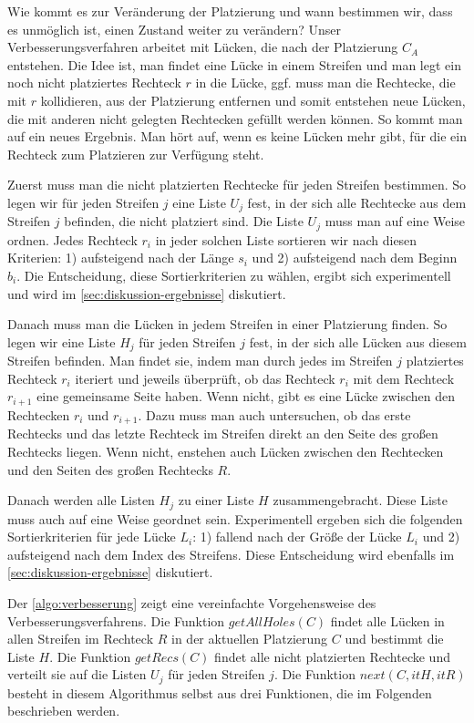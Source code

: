 Wie kommt es zur Veränderung der Platzierung und wann bestimmen wir,
dass es unmöglich ist, einen Zustand weiter zu verändern?
Unser Verbesserungsverfahren arbeitet mit Lücken, die 
nach der Platzierung $C_A$ entstehen.
Die Idee ist, man findet eine Lücke in einem Streifen 
und man legt ein noch nicht platziertes Rechteck $r$ in die Lücke,
ggf. muss man die Rechtecke,
die mit $r$ kollidieren, aus der Platzierung entfernen
und somit entstehen neue Lücken,
die mit anderen nicht gelegten Rechtecken gefüllt werden können.
So kommt man auf ein neues Ergebnis.
Man hört auf, wenn es keine Lücken mehr gibt, für die ein Rechteck zum Platzieren zur Verfügung steht.


Zuerst muss man die nicht platzierten Rechtecke für jeden Streifen bestimmen. 
So legen wir für jeden Streifen $j$ eine Liste $U_j$ fest, in der sich alle 
Rechtecke aus dem Streifen $j$ befinden, die nicht platziert sind.
Die Liste $U_j$ muss man auf eine Weise ordnen.
Jedes Rechteck $r_i$ in jeder solchen Liste sortieren wir nach diesen Kriterien:
1) aufsteigend nach der Länge $s_i$ und 2) aufsteigend nach dem Beginn $b_i$.
Die Entscheidung, diese Sortierkriterien zu wählen, ergibt sich experimentell 
und wird im \cref{sec:diskussion-ergebnisse} diskutiert.


Danach muss man die Lücken in jedem Streifen in einer Platzierung finden.
So legen wir eine Liste $H_j$ für jeden Streifen $j$ fest, in der sich alle
Lücken aus diesem Streifen befinden. Man findet sie, indem
man durch jedes im Streifen $j$ platziertes Rechteck $r_i$ iteriert und jeweils überprüft,
ob das Rechteck $r_i$ mit dem Rechteck $r_{i+1}$ eine gemeinsame Seite haben. Wenn nicht, gibt es eine Lücke
zwischen den Rechtecken $r_i$ und $r_{i+1}$.
Dazu muss man auch untersuchen, ob das erste Rechtecks 
und das letzte Rechteck im Streifen direkt an den Seite des großen Rechtecks liegen. 
Wenn nicht, enstehen auch Lücken zwischen den Rechtecken und den Seiten des großen Rechtecks $R$.  

Danach werden alle Listen $H_j$ zu einer Liste $H$ zusammengebracht.
Diese Liste muss auch auf eine Weise geordnet sein. 
Experimentell ergeben sich die folgenden Sortierkriterien für jede Lücke $L_i$: 
1) fallend nach der Größe der Lücke $L_i$ und 2) aufsteigend nach dem
Index des Streifens. Diese Entscheidung wird ebenfalls im \cref{sec:diskussion-ergebnisse}
diskutiert.



Der \cref{algo:verbesserung} zeigt eine vereinfachte Vorgehensweise des Verbesserungsverfahrens.
Die Funktion $getAllHoles(C)$ findet alle Lücken in allen Streifen im Rechteck $R$ in der
aktuellen Platzierung $C$ und bestimmt die Liste $H$.
Die Funktion $getRecs(C)$ findet alle nicht platzierten Rechtecke und verteilt sie auf
die Listen $U_j$ für jeden Streifen $j$.
Die Funktion $next(C, itH, itR)$ besteht in diesem Algorithmus selbst aus drei Funktionen,
die im Folgenden beschrieben werden.

